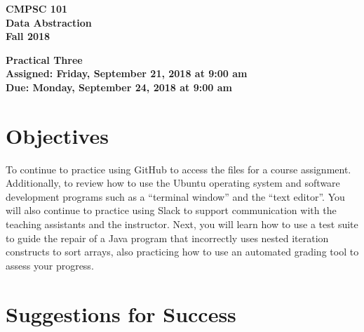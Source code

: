 \documentclass[11pt]{article}
\newcommand{\assignmentduedate}{September 24}
\newcommand{\assignmentassignedate}{September 21}
\newcommand{\assignmentnumber}{Three}
\newcommand{\labyear}{2018}
\newcommand{\labdueday}{Monday}
\newcommand{\labassignday}{Friday}
\newcommand{\labtime}{9:00 am}
\newcommand{\assigneddate}{Assigned: \labassignday, \assignmentassignedate, \labyear{} at \labtime{}}
\newcommand{\duedate}{Due: \labdueday, \assignmentduedate, \labyear{} at \labtime{}}
\newcommand{\labtitle}[1]
{
  \begin{center}
    \begin{center}
      \bf
      CMPSC 101\\Data Abstraction\\
      Fall 2018\\
      \medskip
    \end{center}
    \bf
    #1
  \end{center}
}
\begin{document}
\thispagestyle{empty}

\labtitle{Practical \assignmentnumber{} \\ \assigneddate{} \\ \duedate{}}

\section*{Objectives}

To continue to practice using GitHub to access the files for a course
assignment. Additionally, to review how to use the Ubuntu operating system and
software development programs such as a ``terminal window'' and the ``text
editor''. You will also continue to practice using Slack to support
communication with the teaching assistants and the instructor. Next, you will
learn how to use a test suite to guide the repair of a Java program that
incorrectly uses nested iteration constructs to sort arrays, also practicing how
to use an automated grading tool to assess your progress.

\section*{Suggestions for Success}
\end{document}
